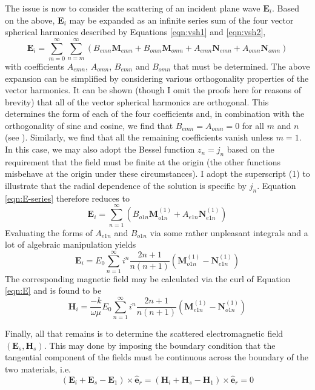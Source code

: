 {The issue is now to consider the scattering of an incident plane wave $\mathbf{E}_i$.  Based on the above, $\mathbf{E}_i$ may be expanded as an infinite series sum of the four vector spherical harmonics described by Equations \ref{eqn:vsh1} and \ref{eqn:vsh2},
\begin{equation}
\label{eqn:E-series}
\mathbf{E}_i = \sum _{m=0} ^{\infty}  \sum _{n=m} ^{\infty} (B_{emn}\mathbf{M}_{emn} + B_{omn}\mathbf{M}_{omn} + A_{emn}\mathbf{N}_{emn} + A_{omn}\mathbf{N}_{omn})
\end{equation}
\noindent with coefficients $A_{emn}$, $A_{omn}$, $B_{emn}$ and $B_{omn}$ that must be determined.  The above expansion can be simplified by considering various orthogonality properties of the vector harmonics.  It can be shown (though I omit the proofs here for reasons of brevity) that all of the vector spherical harmonics are orthogonal.  This determines the form of each of the four coefficients and, in combination with the orthogonality of sine and cosine, we find that $B_{emn}=A_{omn}=0$ for all $m$ and $n$ (see \citet{Bohren1983}).  Similarly, we find that all the remaining coefficients vanish unless $m=1$.  In this case, we may also adopt the Bessel function $z_n=j_n$ based on the requirement that the field must be finite at the origin (the other functions misbehave at the origin under these circumstances).  I adopt the superscript (1) to illustrate that the radial dependence of the solution is specific by $j_n$.  Equation \ref{eqn:E-series} therefore reduces to
\begin{equation}
\mathbf{E}_i = \sum _{n=1} ^{\infty} (B_{o1n}\mathbf{M}_{o1n}^{(1)} + A_{e1n}\mathbf{N}_{e1n}^{(1)})
\end{equation}
Evaluating the forms of $A_{e1n}$ and $B_{o1n}$ via some rather unpleasant integrals and a lot of algebraic manipulation yields
\begin{equation}
\label{eqn:E}
\mathbf{E}_i = E_0 \sum _{n=1} ^{\infty} i^n \frac{2n+1}{n(n+1)}(\mathbf{M}_{o1n}^{(1)} - \mathbf{N}_{e1n}^{(1)})
\end{equation}
The corresponding magnetic field may be calculated via the curl of Equation \ref{eqn:E} and is found to be
\begin{equation}
\label{eqn:H}
\mathbf{H}_i = \frac{-k}{\omega\mu}E_0 \sum _{n=1} ^{\infty} i^n \frac{2n+1}{n(n+1)}(\mathbf{M}_{e1n}^{(1)} - \mathbf{N}_{o1n}^{(1)})
\end{equation}

\noindent Finally, all that remains is to determine the scattered electromagnetic field $(\mathbf{E}_s,\mathbf{H}_s)$.  This may done by imposing the boundary condition that the tangential component of the fields must be continuous across the boundary of the two materials, i.e.
\begin{equation}
(\mathbf{E}_i+\mathbf{E}_s-\mathbf{E}_1)\times \mathbf{\hat{e}}_r=(\mathbf{H}_i+\mathbf{H}_s-\mathbf{H}_1)\times \mathbf{\hat{e}}_r=0
\end{equation}
 
}
